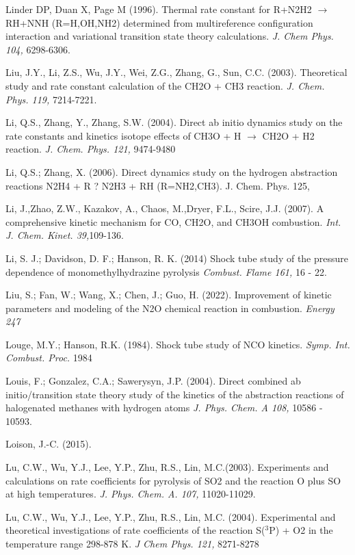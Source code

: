 \documentclass[12pt,landscape]{article}
\newcounter{reaction}
\begin{document}
Linder DP, Duan X, Page M (1996). Thermal rate constant for R+N2H2 $\rightarrow$ RH+NNH (R=H,OH,NH2) determined from multireference configuration interaction and variational transition state theory calculations. {\em J. Chem Phys. 104,} 6298-6306.

Liu, J.Y., Li, Z.S., Wu, J.Y., Wei, Z.G., Zhang, G., Sun, C.C. (2003). Theoretical study and rate constant calculation of the CH2O + CH3 reaction.  {\em J. Chem. Phys. 119,} 7214-7221.

Li, Q.S., Zhang, Y., Zhang, S.W. (2004). Direct ab initio dynamics study on the rate constants and kinetics isotope effects of CH3O + H $\rightarrow$ CH2O + H2 reaction. {\em J. Chem. Phys. 121,}  9474-9480

Li, Q.S.; Zhang, X. (2006).   Direct dynamics study on the hydrogen abstraction reactions N2H4 + R ? N2H3 + RH (R=NH2,CH3).  J. Chem. Phys. 125,

Li, J.,Zhao, Z.W., Kazakov, A., Chaos, M.,Dryer, F.L., Scire, J.J. (2007). A comprehensive kinetic mechanism for CO, CH2O, and CH3OH combustion. {\em  Int. J. Chem. Kinet. 39,}109-136.

Li, S. J.; Davidson, D. F.; Hanson, R. K. (2014)
Shock tube study of the pressure dependence of monomethylhydrazine pyrolysis
{\em Combust. Flame 161,} 16 - 22.

Liu, S.; Fan, W.; Wang, X.; Chen, J.; Guo, H. (2022). Improvement of kinetic parameters and modeling of the N2O chemical reaction in combustion.
{\em Energy 247}

Louge, M.Y.; Hanson, R.K. (1984).  Shock tube study of NCO kinetics.
{\em  Symp. Int. Combust. Proc.} 1984

Louis, F.; Gonzalez, C.A.; Sawerysyn, J.P. (2004).
Direct combined ab initio/transition state theory study of the kinetics of the abstraction reactions of halogenated methanes with hydrogen atoms
{\em  J. Phys. Chem. A 108,} 10586 - 10593.

Loison, J.-C. (2015).

Lu, C.W., Wu, Y.J., Lee, Y.P., Zhu, R.S., Lin, M.C.(2003). Experiments and calculations on rate coefficients for pyrolysis of SO2 and the reaction O plus SO at high temperatures. {\em J. Phys. Chem. A. 107,} 11020-11029.

Lu, C.W., Wu, Y.J., Lee, Y.P., Zhu, R.S., Lin, M.C. (2004). Experimental and theoretical investigations of rate coefficients of the reaction S($^3$P) + O2 in the temperature range 298-878 K.  {\em J Chem Phys. 121,} 8271-8278
\end{document}
